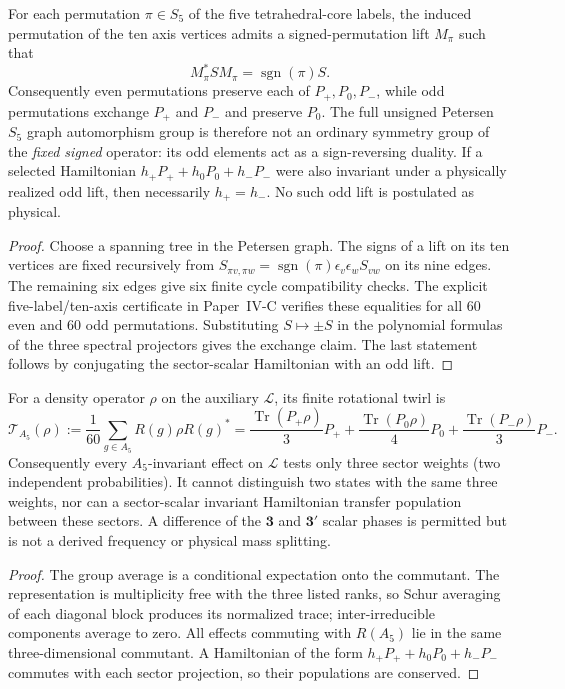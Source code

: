 \documentclass[12pt,a4paper]{article}
\begin{document}
\begin{proposition}
\label{p4a:prop:v320-parity-graded-mirror-exchange}
For each permutation $\pi\in S_5$ of the five tetrahedral-core
labels, the induced permutation of the ten axis vertices admits a
signed-permutation lift $M_\pi$ such that
\[
 M_\pi^* S M_\pi=\operatorname{sgn}(\pi)S.
\]
Consequently even permutations preserve each of
$P_+,P_0,P_-$, while odd permutations exchange $P_+$ and $P_-$
and preserve $P_0$. The full unsigned Petersen $S_5$ graph
automorphism group is therefore not an ordinary symmetry group of
the \emph{fixed signed} operator: its odd elements act as a
sign-reversing duality. If a selected Hamiltonian $h_+P_++h_0P_0+h_-P_-$
were also invariant under a physically realized odd lift, then
necessarily $h_+=h_-$. No such odd lift is postulated as physical.
\end{proposition}
\begin{proof}
Choose a spanning tree in the Petersen graph. The signs of a lift
on its ten vertices are fixed recursively from
$S_{\pi v,\pi w}=\operatorname{sgn}(\pi)\epsilon_v\epsilon_wS_{vw}$
on its nine edges. The remaining six edges give six finite cycle
compatibility checks. The explicit five-label/ten-axis certificate
in Paper~IV-C verifies these equalities for all $60$ even and $60$
odd permutations. Substituting $S\mapsto\pm S$ in the polynomial
formulas of the three spectral projectors gives the exchange claim.
The last statement follows by conjugating the sector-scalar
Hamiltonian with an odd lift.
\end{proof}

\begin{corollary}
\label{p4a:cor:v320-signed-twirl}
For a density operator $\rho$ on the auxiliary $\mathcal L$, its
finite rotational twirl is
\[
 \mathscr T_{A_5}(\rho)
 :=\frac1{60}\sum_{g\in A_5}R(g)\rho R(g)^*
 =\frac{\operatorname{Tr}(P_+\rho)}3P_+
 +\frac{\operatorname{Tr}(P_0\rho)}4P_0
 +\frac{\operatorname{Tr}(P_-\rho)}3P_-.
\]
Consequently every $A_5$-invariant effect on $\mathcal L$ tests only
three sector weights (two independent probabilities). It cannot
distinguish two states with the same three weights, nor can a
sector-scalar invariant Hamiltonian transfer population between these
sectors. A difference of the $\mathbf3$ and $\mathbf3'$ scalar phases
is permitted but is not a derived frequency or physical mass splitting.
\end{corollary}
\begin{proof}
The group average is a conditional expectation onto the commutant.
The representation is multiplicity free with the three listed ranks,
so Schur averaging of each diagonal block produces its normalized
trace; inter-irreducible components average to zero. All effects
commuting with $R(A_5)$ lie in the same three-dimensional commutant.
A Hamiltonian of the form $h_+P_++h_0P_0+h_-P_-$ commutes with each
sector projection, so their populations are conserved.
\end{proof}
\end{document}
